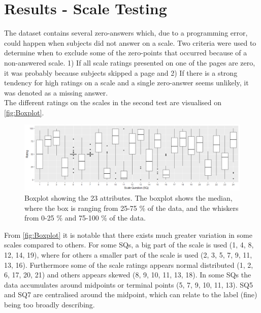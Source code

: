 \section{Results - Scale Testing}
\label{ResultsScaleTesting}
%
The dataset contains several zero-answers which, due to a programming error, could happen when subjects did not answer on a scale. Two criteria were used to determine when to exclude some of the zero-points that occurred because of a non-answered scale. 1) If all scale ratings presented on one of the pages are zero, it was probably because subjects skipped a page and 2) If there is a strong tendency for high ratings on a scale and a single zero-answer seems unlikely, it was denoted as a missing answer.\\

\noindent
The different ratings on the scales in the second test are visualised on \autoref{fig:Boxplot}.
%
%

\begin{figure}[!b]
	\centering
	\includegraphics[width=6.9in]{Figure/Boksplot24uden0}
	\hfil
	\caption{Boxplot showing the 23 attributes. The boxplot shows the median, where the box is ranging from 25-75 \% of the data, and the whiskers from 0-25 \% and 75-100 \% of the data.}
	\label{fig:Boxplot}
%	
\end{figure}

%
From \autoref{fig:Boxplot}  it is notable that there exists much greater variation in some scales compared to others. For some SQs, a big part of the scale is used (1, 4, 8, 12, 14, 19), where for others a smaller part of the scale is used (2, 3, 5, 7, 9, 11, 13, 16). Furthermore some of the scale ratings appears normal distributed (1, 2, 6, 17, 20, 21) and others appears skewed (8, 9, 10, 11, 13, 18). In some SQs the data accumulates around midpoints or terminal points (5, 7, 9, 10, 11, 13). SQ5 and SQ7 are centralised around the midpoint, which can relate to the label (fine) being too broadly describing. \\ 

